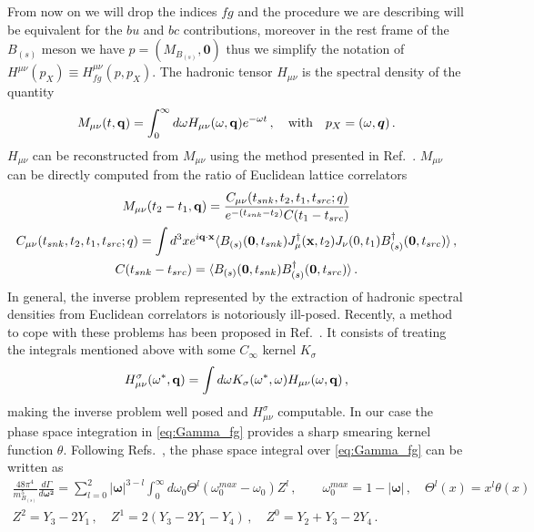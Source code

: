 From now on we will drop the indices $fg$
and the procedure we are describing will be equivalent for the $bu$ and $bc$ contributions,
moreover
in the rest frame of the $B_{(s)}$ meson we have $p=(M_{B_{(s)}},\bm{0})$ thus we simplify the notation of
$H^{\mu\nu}(p_X)\equiv H^{\mu\nu}_{fg}(p,p_X)$.
The hadronic tensor $H_{\mu\nu}$ is
the spectral density of the quantity
\begin{equation}
  M_{\mu\nu}(t,{\bf q})= \int_0^{\infty}d \omega H_{\mu\nu} (\omega,{\bf q}) e^{-\omega t}\,,\quad \text{with}\quad p_X=(\omega,\bm{q})\,.
\end{equation}
$H_{\mu\nu}$ can be reconstructed from $M_{\mu\nu}$ using the method presented in
Ref.~\cite{Hansen:2019idp}. $M_{\mu\nu}$ can be directly computed from the
ratio of Euclidean lattice correlators
\begin{gather}
  M_{\mu\nu}(t_2-t_1,{\bf q})=\frac{C_{\mu\nu}(t_{snk},t_2,t_1,t_{src};q)}{e^{-(t_{snk}-t_2)}  C(t_1-t_{src}) }\label{eq:ratio_4pt_2pt}\\
  \label{eq:4pt}
  C_{\mu\nu}(t_{snk},t_2,t_1,t_{src};q)=\int d^3x e^{i{\bf q}\cdot {\bf x}}
  \langle B_{(s)}({\bf 0}, t_{snk}) J^{\dagger}_\mu({\bf x},t_2)  J_\nu(0,t_1)
  B_{(s)}^\dagger({\bf 0}, t_{src})\rangle\,,\\
  \label{eq:2pt}
  C(t_{snk}-t_{src}) =  \langle B_{(s)}({\bf 0}, t_{snk})
  B_{(s)}^\dagger({\bf 0}, t_{src})\rangle\,.
\end{gather}
In general, the inverse problem represented by the extraction of
hadronic spectral densities from Euclidean correlators is notoriously
ill-posed. Recently, a method to cope with these problems has been
proposed in Ref.~\cite{Hansen:2019idp}. It consists of treating the
integrals mentioned above with some $C_\infty$ kernel $K_\sigma$
\begin{equation}
  H^\sigma_{\mu\nu}(\omega^*, {\bf q})= \int d \omega K_\sigma( \omega^*,\omega ) H_{\mu\nu}(\omega, {\bf q})\,,
\end{equation}
making the inverse problem well posed and $H^\sigma_{\mu\nu}$ computable.
In our case the phase space integration in \eqref{eq:Gamma_fg}
provides a sharp smearing kernel function $\theta$. Following
Refs.~\cite{Gambino:2020crt, Gambino:2022dvu}, the phase space integral over
\eqref{eq:Gamma_fg} can be written as
\begin{gather}
  \frac{48 \pi^4}{m_{B_{(s)}}^5}\frac{d\Gamma}{d \bm{ \omega^2} }
  =\sum_{l=0}^2 |\bm{\omega}|^{3-l}\int_0^{\infty}d \omega_0 \Theta^l(\omega_0^{max}-\omega_0) Z^l\,,\quad\quad {\omega}_0^{max}=1-|\bm{\omega}|\,,\quad\Theta^l(x)=x^l\theta(x)\\
  Z^2=Y_3-2Y_1\,,\quad Z^1=2(Y_3-2Y_1-Y_4)\,,\quad Z^0=Y_2+Y_3-2Y_4\,.
\end{gather}
